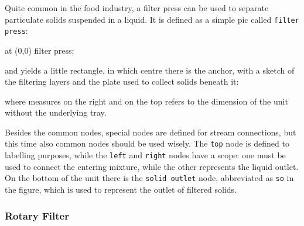 \documentclass[12pt]{article}						%
\newcommand*{\chpn}[1]{\texttt{#1}}				%
\newcommand*{\chpp}[1]{\texttt{#1}}				%
\begin{document}
Quite common in the food industry, a filter press can be used to separate
particulate solids suspended in a liquid. It is defined as a simple pic called
\chpp{filter press}:
\begin{chpcode}
	\pic at (0,0) {filter press};
\end{chpcode}
and yields a little rectangle, in which centre there is the anchor, with a sketch
of the filtering layers and the plate used to collect solids beneath it:
\begin{center}
\end{center}
where measures on the right and on the top refers to the dimension of the unit
without the underlying tray.

Besides the common nodes, special nodes are defined for stream connections, but
this time also common nodes should be used wisely. The \chpn{top} node is
defined to labelling purposes, while the \chpn{left} and \chpn{right} nodes have
a scope: one must be used to connect the entering mixture, while the other
represents the liquid outlet. On the bottom of the unit there is the \chpn{solid
outlet} node, abbreviated as \chpn{so} in the figure, which is used to represent
the outlet of filtered solids.

\subsubsection{Rotary Filter}
\end{document}
